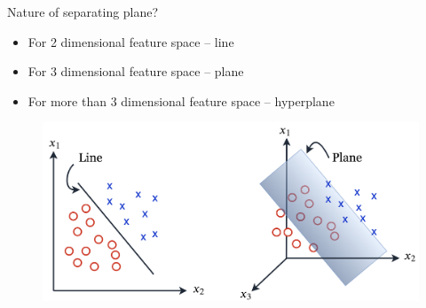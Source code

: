 \begin{frame}{Nature of separating plane?}
\begin{itemize}
\item For 2 dimensional feature space -- {\color{maroon}line}
\item For 3 dimensional feature space -- {\color{maroon}plane}
\item For more than 3 dimensional feature space -- {\color{maroon}hyperplane}
\end{itemize}
\begin{figure}
\includegraphics[scale=0.36]{Figures/Plane.png}
\end{figure}
\end{frame}

